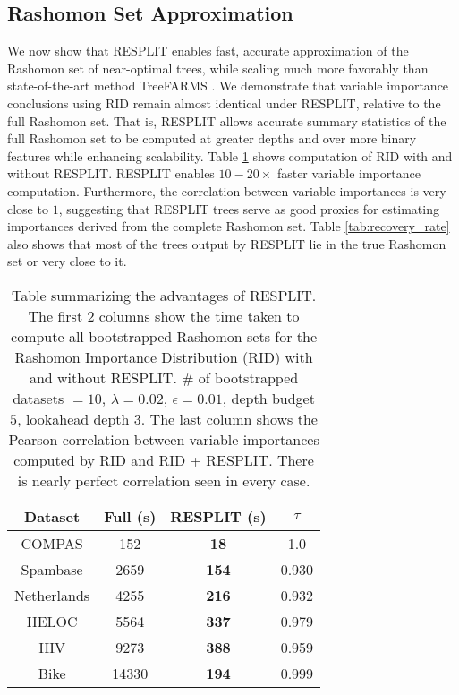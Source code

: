 \subsection{Rashomon Set Approximation}
We now show that RESPLIT enables fast, accurate approximation of the Rashomon set of near-optimal trees, while scaling much more favorably than state-of-the-art method TreeFARMS \cite{xin2022treefarms}. We demonstrate that variable importance conclusions using RID \cite{donnelly2023the} remain almost identical under RESPLIT, relative to the full Rashomon set. That is, RESPLIT allows accurate summary statistics of the full Rashomon set to be computed at greater depths and over more binary features while enhancing scalability. Table \ref{tab:results} shows computation of RID with and without RESPLIT. RESPLIT enables $10-20\times$ faster variable importance computation. Furthermore, the correlation between variable importances is very close to $1$, suggesting that RESPLIT trees serve as good proxies for estimating importances derived from the complete Rashomon set. Table \ref{tab:recovery_rate} also shows that most of the trees output by RESPLIT lie in the true Rashomon set or very close to it.  


\begin{table}[h]
\centering
\begin{tabular}{c|c|c|c}
{\textbf{Dataset}} & \textbf{Full}\textbf{ (s)} & \textbf{RESPLIT} \textbf{(s)} & $\tau$ \\
\hline
COMPAS & 152 & \textbf{18}  & 1.0 \\
Spambase & 2659 & \textbf{154} & 0.930 \\
Netherlands & 4255 & \textbf{216} & 0.932 \\ 
HELOC & 5564 & \textbf{337} & 0.979 \\
HIV & 9273  & \textbf{388} & 0.959 \\
Bike & 14330 & \textbf{194} & 0.999 \\
\end{tabular}
\caption{Table summarizing the advantages of RESPLIT. The first $2$ columns show the time taken to compute all bootstrapped Rashomon sets for the Rashomon Importance Distribution (RID) \cite{donnelly2023the} with and without RESPLIT. $\#$ of bootstrapped datasets $= 10$, $\lambda = 0.02$, $\epsilon = 0.01$, depth budget $5$, lookahead depth $3$. The last column shows the Pearson correlation between variable importances computed by RID and RID + RESPLIT. There is nearly perfect correlation seen in every case.}
\label{tab:results}
\end{table}

